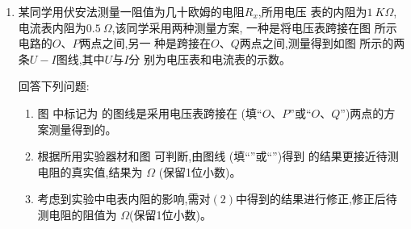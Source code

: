 \begin{enumerate}
\item 
某同学用伏安法测量一阻值为几十欧姆的电阻$ R_{x}$,所用电压
表的内阻为$ 1 \ K\Omega $,电流表内阻为$ 0.5 \ \Omega $,该同学采用两种测量方案,
一种是将电压表跨接在图  所示电路的$ O $、$ P $两点之间,另一
种是跨接在$ O $、$ Q $两点之间,测量得到如图  所示的两条$ U-I $图线,其中$ U $与$ I $分
别为电压表和电流表的示数。
\begin{figure}[!htp]
\centering
%
%  
\begin{subfigure}{0.25\linewidth}
\centering
 
\caption{}\label{2020:全国1:9a}
\end{subfigure}
\hfill
\begin{subfigure}{0.71\linewidth}
\centering
 
\caption{}\label{2020:全国1:9b}
\end{subfigure}
\end{figure}



回答下列问题$ : $

\begin{enumerate}
\item
图  中标记为  的图线是采用电压表跨接在 \underlinegap (填“$ O $、$ P $”或“$ O $、$ Q $”)两点的方案测量得到的。





\item \label{2020-9-2}
根据所用实验器材和图  可判断,由图线 \underlinegap (填“”或“”)得到
的结果更接近待测电阻的真实值,结果为 \underlinegap $ \Omega $
(保留1位小数)。



\item 
考虑到实验中电表内阻的影响,需对$ (2) $中得到的结果进行修正,修正后待
测电阻的阻值为 \underlinegap 
$ \Omega $(保留1位小数)。

\end{enumerate}




\end{enumerate}
